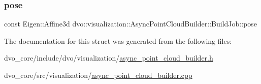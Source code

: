 \subsubsection{\texorpdfstring{pose}{pose}}
{\footnotesize\ttfamily const Eigen\+::\+Affine3d dvo\+::visualization\+::\+Async\+Point\+Cloud\+Builder\+::\+Build\+Job\+::pose}



The documentation for this struct was generated from the following files\+:\begin{DoxyCompactItemize}
\item 
dvo\+\_\+core/include/dvo/visualization/\mbox{\hyperlink{async__point__cloud__builder_8h}{async\+\_\+point\+\_\+cloud\+\_\+builder.\+h}}\item 
dvo\+\_\+core/src/visualization/\mbox{\hyperlink{async__point__cloud__builder_8cpp}{async\+\_\+point\+\_\+cloud\+\_\+builder.\+cpp}}\end{DoxyCompactItemize}
